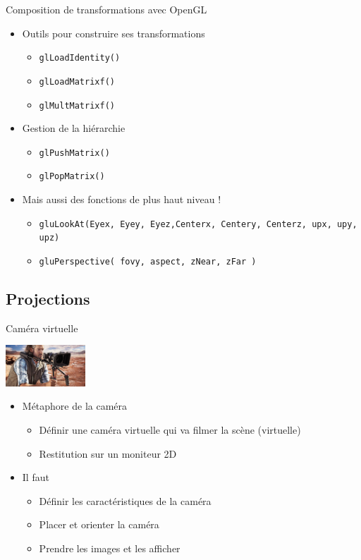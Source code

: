 \begin{frame}{Composition de transformations avec OpenGL}
\begin{itemize}
\item Outils pour construire ses transformations
\begin{itemize}
\item \texttt{glLoadIdentity()}
\item \texttt{glLoadMatrixf()}
\item \texttt{glMultMatrixf()}
\end{itemize}
\item Gestion de la hiérarchie
\begin{itemize}
\item \texttt{glPushMatrix()}
\item \texttt{glPopMatrix()}
\end{itemize}
\item Mais aussi des fonctions de plus haut niveau !
\begin{itemize}
\item \texttt{gluLookAt(Eyex, Eyey, Eyez,Centerx, Centery, Centerz, upx, upy, upz)}
\item \texttt{gluPerspective( fovy, aspect, zNear, zFar )}
\end{itemize}
\end{itemize}
\end{frame}

\subsection{Projections}

\begin{frame}{Caméra virtuelle}
\begin{center}
\includegraphics[width=3cm]{figs/camerar.jpg}
\end{center}
\begin{itemize}
\item Métaphore de la caméra
\begin{itemize}
\item Définir une caméra virtuelle qui va filmer la scène (virtuelle)
\item Restitution sur un moniteur 2D
\end{itemize}
\item Il faut
\begin{itemize}
\item Définir les caractéristiques de la caméra
\item Placer et orienter la caméra
\item Prendre les images et les afficher
\end{itemize}
\end{itemize}
\end{frame}

